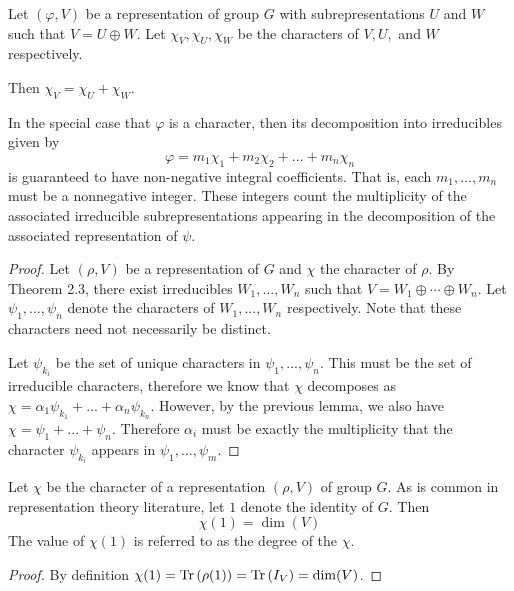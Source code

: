 \begin{lemma}
    Let $(\varphi, V)$ be a representation of group $G$ with subrepresentations $U$ and $W$ such that $V = U \oplus 
    W$. Let $\chi_V, \chi_U, \chi_W$ be the characters of $V, U,$ and $W$ respectively.

    Then $\chi_V = \chi_U + \chi_W$.
\end{lemma}

\begin{theorem}
    In the special case that $\varphi$ is a character, then its decomposition into irreducibles given by
    \[
        \varphi = m_1\chi_1 + m_2 \chi_2 + ... + m_n \chi_n
    \]
    is guaranteed to have non-negative integral coefficients. That is, each $m_1,...,m_n$ must be a nonnegative 
    integer. These integers count the multiplicity of the associated irreducible subrepresentations appearing in 
    the decomposition of the associated representation of $\psi$.
\end{theorem}

\begin{proof}
    Let $(\rho, V)$ be a representation of $G$ and $\chi$ the character of $\rho$. By Theorem 2.3, there exist 
    irreducibles $W_1, ..., W_n$ such that $V = W_1 \oplus \cdots \oplus W_n$. Let $\psi_1, ..., \psi_n$ denote the 
    characters of $W_1, ..., W_n$ respectively. Note that these characters need not necessarily be distinct.

Let $\psi_{k_i}$ be the set of unique characters in $\psi_1, ..., \psi_n$. This must be the set of irreducible 
characters, therefore we know that $\chi$ decomposes as $\chi = \alpha_1\psi_{k_1} + ... + \alpha_n\psi_{k_n}$.  
However, by the previous lemma, we also have $\chi = \psi_1 + ... +  \psi_n$. Therefore $\alpha_i$ must be exactly 
the multiplicity that the character $\psi_{k_i}$ appears in $\psi_1, ..., \psi_m$.
\end{proof}


\begin{proposition}
    Let $\chi$ be the character of a representation $(\rho, V)$ of group $G$. As is common in representation theory 
    literature, let $1$ denote the identity of $G$. Then
    \[
        \chi(1) = \dim(V)
    \]
    The value of $\chi(1)$ is referred to as the degree of the $\chi$.
\end{proposition}

\begin{proof}
    By definition $\chi(1) = \text{Tr}\,(\rho(1)) = \text{Tr}\,(I_V) =  \dim(V)$.
\end{proof}

